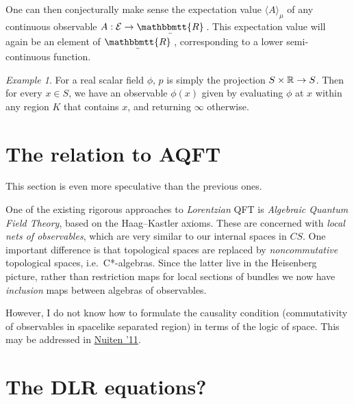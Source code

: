 \documentclass[11pt, oneside, article]{memoir}
\theoremstyle{plain}
\theoremstyle{definition}
\theoremstyle{remark}
\newtheorem{example}[theorem]{Example}
\newcommand{\ubar}[1]{\underaccent{\bar}{#1}}
\newcommand{\internal}[1]{\raisebox{-.03ex}{$\mathbbmtt{#1}$}}
\newcommand{\hs}{\hspace{1.1pt}}
\newcommand{\tRR}{\internal{R}\hs}
\newcommand{\tLR}{\ubar{\tRR}\hs}
\begin{document}
One can then conjecturally make sense the expectation value $\langle A \rangle_\mu$ of any continuous observable $A : \mathcal{E} \to \tLR$. This expectation value will again be an element of $\tLR$, corresponding to a lower semi-continuous function.

\begin{example}
For a real scalar field $\phi$, $p$ is simply the projection $S \times \mathbb{R} \to S$. Then for every $x\in S$, we have an observable $\phi(x)$ given by evaluating $\phi$ at $x$ within any region $K$ that contains $x$, and returning $\infty$ otherwise.
\end{example}

\chapter{The relation to AQFT}

This section is even more speculative than the previous ones.

One of the existing rigorous approaches to \emph{Lorentzian} QFT is \emph{Algebraic Quantum Field Theory}, based on the Haag--Kastler axioms. These are concerned with \emph{local nets of observables}, which are very similar to our internal spaces in $CS$. One important difference is that topological spaces are replaced by \emph{noncommutative} topological spaces, i.e.~C*-algebras. Since the latter live in the Heisenberg picture, rather than restriction maps for local sections of bundles we now have \emph{inclusion} maps between algebras of observables.

However, I do not know how to formulate the causality condition (commutativity of observables in spacelike separated region) in terms of the logic of space. This may be addressed in \href{https://arxiv.org/abs/1109.1397}{Nuiten '11}.


\chapter{The DLR equations?}

\printbibliography
\end{document}
